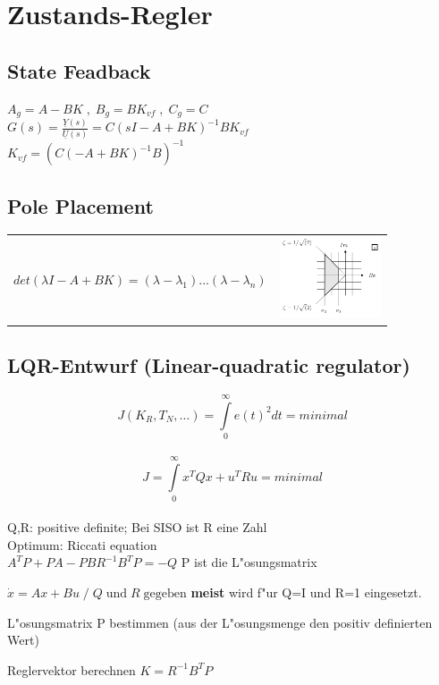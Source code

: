 \section{Zustands-Regler}
\subsection{State Feadback}

$A_g = A-BK \; , \; B_g = BK_{vf} \; , \; C_g = C $\\
$G(s) = \frac{\underline{Y}(s)}{\underline{U}(s)} = C(sI-A+BK)^{-1}BK_{vf}$\\
$K_{vf} = (C(-A+BK)^{-1}B)^{-1}$

\subsection{Pole Placement}

\begin{tabular}{ll}
	\parbox{8cm}{$det(\lambda I-A+BK) = (\lambda - \lambda_1)...(\lambda - \lambda_n)$} &
	\parbox{3cm}{\includegraphics[width=3cm]{./bilder/pole_locations.png}}
\end{tabular}

\newpage

\subsection{LQR-Entwurf (Linear-quadratic regulator)}
	$$J(K_R,T_N,\ldots)=\int\limits^{\infty}_0 e(t)^2 dt = minimal$$\\
	$$J=\int\limits_0^{\infty} {x^T Q x+u^T R u}= minimal$$\\
	Q,R: positive definite; Bei SISO ist R eine Zahl\\
	Optimum: Riccati equation\\
	$ A^T P + P A - P B R^{-1} B^T P = -Q$ \hspace{2cm}
	P ist die L"osungsmatrix
	\begin{aufzaehlung}
    	\item $\dot{x} = Ax + Bu \; / \;  Q \; \text{und} \; R \; \text{gegeben}$
    	\textbf{meist} wird f"ur Q=I und R=1 eingesetzt.
    	\item L"osungsmatrix P bestimmen (aus der L"osungsmenge den positiv
    	definierten Wert)
    	\item Reglervektor berechnen $K=R^{-1} B^T P$
    \end{aufzaehlung}

